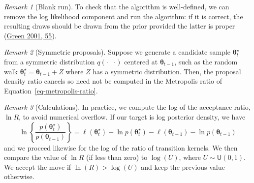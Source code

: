 \documentclass[
  11pt,
  letterpaper,
]{scrbook}
\theoremstyle{definition}
\theoremstyle{definition}
\theoremstyle{definition}
\theoremstyle{plain}
\theoremstyle{remark}
\newtheorem*{remark}{Remark}
\begin{document}
\begin{remark}[Blank run]

To check that the algorithm is well-defined, we can remove the log
likelihood component and run the algorithm: if it is correct, the
resulting draws should be drawn from the prior provided the latter is
proper (\protect\hyperlink{ref-Green:2001}{Green 2001, 55}).

\end{remark}

\begin{remark}[Symmetric proposals]

Suppose we generate a candidate sample \(\boldsymbol{\theta}_t^{\star}\)
from a symmetric distribution \(q(\cdot \mid \cdot)\) centered at
\(\boldsymbol{\theta}_{t-1}\), such as the random walk
\(\boldsymbol{\theta}_t^{\star} =\boldsymbol{\theta}_{t-1}+ Z\) where
\(Z\) has a symmetric distribution. Then, the proposal density ratio
cancels so need not be computed in the Metropolis ratio of
Equation~\ref{eq-metropolis-ratio}.

\end{remark}

\begin{remark}[Calculations]

In practice, we compute the log of the acceptance ratio, \(\ln R\), to
avoid numerical overflow. If our target is log posterior density, we
have \[
\ln \left\{\frac{p(\boldsymbol{\theta}_t^{\star})}{p(\boldsymbol{\theta}_{t-1})}\right\} = \ell(\boldsymbol{\theta}_t^{\star}) + \ln p(\boldsymbol{\theta}_t^{\star}) - \ell(\boldsymbol{\theta}_{t-1}) - \ln p(\boldsymbol{\theta}_{t-1}) 
\] and we proceed likewise for the log of the ratio of transition
kernels. We then compare the value of \(\ln R\) (if less than zero) to
\(\log(U)\), where \(U \sim \mathsf{U}(0,1)\). We accept the move if
\(\ln(R) >\log(U)\) and keep the previous value otherwise.

\end{remark}
\end{document}
